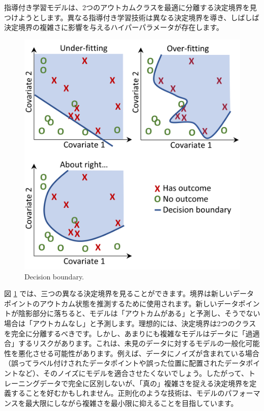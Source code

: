 \documentclass[
  11pt]{book}
\theoremstyle{definition}
\theoremstyle{definition}
\theoremstyle{definition}
\theoremstyle{definition}
\theoremstyle{remark}
\begin{document}
指導付き学習モデルは、2つのアウトカムクラスを最適に分離する決定境界を見つけようとします。異なる指導付き学習技術は異なる決定境界を導き、しばしば決定境界の複雑さに影響を与えるハイパーパラメータが存在します。 

\begin{figure}

{\centering \includegraphics[width=0.8\linewidth]{images/PatientLevelPrediction/decisionBoundary} 

}

\caption{Decision boundary.}\label{fig:decisionBoundary}
\end{figure}

図 \ref{fig:decisionBoundary} では、三つの異なる決定境界を見ることができます。境界は新しいデータポイントのアウトカム状態を推測するために使用されます。新しいデータポイントが陰影部分に落ちると、モデルは「アウトカムがある」と予測し、そうでない場合は「アウトカムなし」と予測します。理想的には、決定境界は2つのクラスを完全に分離するべきです。しかし、あまりにも複雑なモデルはデータに「過適合」するリスクがあります。これは、未見のデータに対するモデルの一般化可能性を悪化させる可能性があります。例えば、データにノイズが含まれている場合（誤ってラベル付けされたデータポイントや誤った位置に配置されたデータポイントなど）、そのノイズにモデルを適合させたくないでしょう。したがって、トレーニングデータで完全に区別しないが、「真の」複雑さを捉える決定境界を定義することを好むかもしれません。正則化のような技術は、モデルのパフォーマンスを最大限にしながら複雑さを最小限に抑えることを目指しています。
\end{document}
